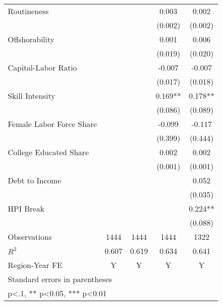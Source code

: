 \begin{table}[htbp]
\begin{tabular}{l*{4}{c}}
\addlinespace
Routineness         &            &            &    0.003   &    0.002   \\
                    &            &            &  (0.002)   &  (0.002)   \\
\addlinespace
Offshorability      &            &            &    0.001   &    0.006   \\
                    &            &            &  (0.019)   &  (0.020)   \\
\addlinespace
Capital-Labor Ratio &            &            &   -0.007   &   -0.007   \\
                    &            &            &  (0.017)   &  (0.018)   \\
\addlinespace
Skill Intensity     &            &            &    0.169** &    0.178** \\
                    &            &            &  (0.086)   &  (0.089)   \\
\addlinespace
Female Labor Force Share&            &            &   -0.099   &   -0.117   \\
                    &            &            &  (0.399)   &  (0.444)   \\
\addlinespace
College Educated Share&            &            &    0.002   &    0.002   \\
                    &            &            &  (0.001)   &  (0.001)   \\
\addlinespace
Debt to Income      &            &            &            &    0.052   \\
                    &            &            &            &  (0.035)   \\
\addlinespace
HPI Break           &            &            &            &    0.224** \\
                    &            &            &            &  (0.088)   \\
\midrule
Observations        &     1444   &     1444   &     1444   &     1322   \\
\(R^{2}\)           &    0.607   &    0.619   &    0.634   &    0.641   \\
Region-Year FE      &        Y   &        Y   &        Y   &        Y   \\
\bottomrule
\multicolumn{5}{l}{\footnotesize Standard errors in parentheses}\\
\multicolumn{5}{l}{\footnotesize * p<.1, ** p<0.05, *** p<0.01}\\
\end{tabular}
\end{table}
